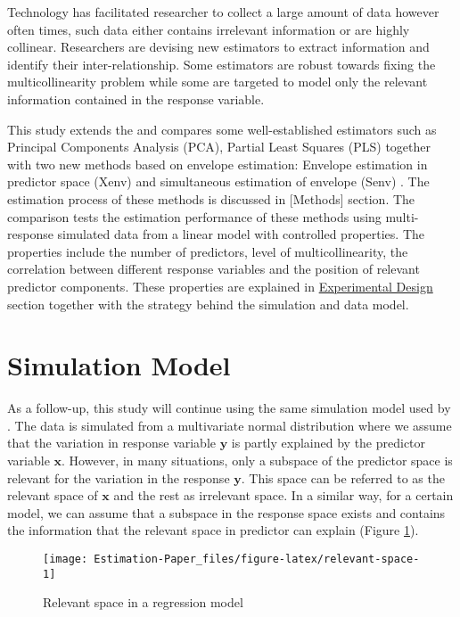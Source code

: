 \documentclass[12pt,3p,authoryear]{elsarticle}
\begin{document}
Technology has facilitated researcher to collect a large amount of data
however often times, such data either contains irrelevant information or
are highly collinear. Researchers are devising new estimators to extract
information and identify their inter-relationship. Some estimators are
robust towards fixing the multicollinearity problem while some are
targeted to model only the relevant information contained in the
response variable.

This study extends the \citep{rimal2019pred} and compares some
well-established estimators such as Principal Components Analysis (PCA),
Partial Least Squares (PLS) together with two new methods based on
envelope estimation: Envelope estimation in predictor space (Xenv)
\citep{cook2010envelope} and simultaneous estimation of envelope (Senv)
\citep{cook2015simultaneous}. The estimation process of these methods is
discussed in {[}Methods{]} section. The comparison tests the estimation
performance of these methods using multi-response simulated data from a
linear model with controlled properties. The properties include the
number of predictors, level of multicollinearity, the correlation
between different response variables and the position of relevant
predictor components. These properties are explained in
\protect\hyperlink{experimental-design}{Experimental Design} section
together with the strategy behind the simulation and data model.

\section{Simulation Model}\label{simulation-model}

As a follow-up, this study will continue using the same simulation model
used by \citet{rimal2019pred}. The data is simulated from a multivariate
normal distribution where we assume that the variation in response
variable \(\mathbf{y}\) is partly explained by the predictor variable
\(\mathbf{x}\). However, in many situations, only a subspace of the
predictor space is relevant for the variation in the response
\(\mathbf{y}\). This space can be referred to as the relevant space of
\(\mathbf{x}\) and the rest as irrelevant space. In a similar way, for a
certain model, we can assume that a subspace in the response space
exists and contains the information that the relevant space in predictor
can explain (Figure \ref{fig:relevant-space}).

\begin{figure}

{\centering \texttt{[image: Estimation-Paper\_files/figure-latex/relevant-space-1]} 

}

\caption{Relevant space in a regression model}\label{fig:relevant-space}
\end{figure}
\end{document}

